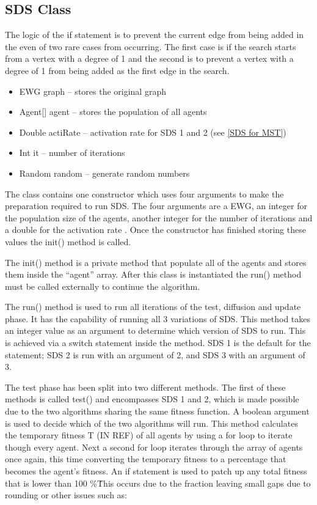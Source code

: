 \documentclass{AISB2008}
\begin{document}
\subsection{SDS Class}

The logic of the if statement is to prevent the current edge from being added in the even of two rare cases from occurring. The first case is if the search starts from a vertex with a degree of 1 and the second is to prevent a vertex with a degree of 1 from being added as the first edge in the search.

\begin{itemize}
\item EWG graph – stores the original graph
\item Agent[] agent – stores the population of all agents
\item Double actiRate – activation rate for SDS 1 and 2 (see \ref{SDS for MST})
\item Int it – number of iterations
\item Random random – generate random numbers
\end{itemize}

The class contains one constructor which uses four arguments to make the preparation required to run SDS. The four arguments are a EWG, an integer for the population size of the agents, another integer for the number of iterations and a double for the activation rate . Once the constructor has finished storing these values the init() method is called.

The init() method is a private method that populate all of the agents and stores them inside the “agent” array. After this class is instantiated the run() method must be called externally to continue the algorithm.

The run() method is used to run all iterations of the test, diffusion and update phase. It has the capability of running all 3 variations of SDS. This method takes an integer value as an argument to determine which version of SDS to run. This is achieved via a switch statement inside the method. SDS 1 is the default for the statement; SDS 2 is run with an argument of 2, and SDS 3 with an argument of 3.

The test phase has been split into two different methods.  The first of these methods is called test() and encompasses SDS 1 and 2, which is made possible due to the two algorithms sharing the same fitness function.  A boolean argument is used to decide which of the two algorithms will run. This method calculates the temporary fitness T (IN REF) of all agents by using a for loop to iterate though every agent. Next a second for loop iterates through the array of agents once again, this time converting the temporary fitness to a percentage that becomes the agent’s fitness. An if statement is used to patch up any total fitness that is lower than 100 \%\. This occurs due to the fraction leaving small gaps due to rounding or other issues such as:
\end{document}
